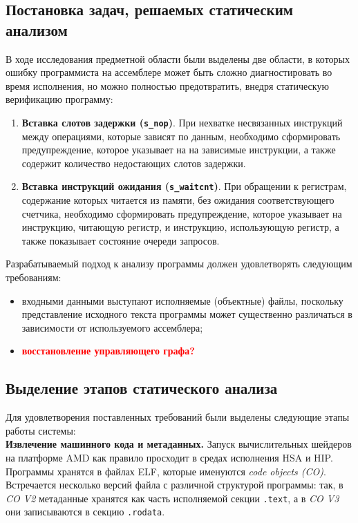 \documentclass[a4paper,14pt]{extarticle}
\newcommand{\todo}[1]{\textbf{\textcolor{red}{#1}}}
\newcommand{\topic}[1]{\textbf{#1.}}
\newenvironment{ul}{\begin{itemize}[noitemsep,topsep=0em]}{\end{itemize}\vspace{4mm}}
\newenvironment{ol}{\begin{enumerate}[noitemsep,topsep=0em]}{\end{enumerate}\vspace{4mm}}
\begin{document}
\subsection{Постановка задач, решаемых статическим анализом}

В ходе исследования предметной области были выделены две области, в которых ошибку программиста
на ассемблере может быть сложно диагностировать во время исполнения, но можно полностью
предотвратить, внедря статическую верификацию программу:
\begin{ol}
\item \textbf{Вставка слотов задержки (\texttt{s\_nop})}. При нехватке несвязанных инструкций между операциями, которые зависят по данным, необходимо сформировать предупреждение, которое указывает на
на зависимые инструкции, а также содержит количество недостающих слотов задержки.
\item \textbf{Вставка инструкций ожидания (\texttt{s\_waitcnt})}. При обращении к регистрам, содержание которых читается из памяти, без ожидания соответствующего счетчика, необходимо сформировать предупреждение, которое указывает на инструкцию, читающую регистр, и инструкцию, использующую регистр, а также показывает состояние очереди запросов.
\end{ol}

Разрабатываемый подход к анализу программы должен удовлетворять следующим требованиям:

\begin{ul}
\item входными данными выступают исполняемые (объектные) файлы, поскольку представление исходного текста программы может существенно различаться в зависимости от используемого ассемблера;
\item \todo{восстановление управляющего графа?}
\end{ul}

\subsection{Выделение этапов статического анализа}

Для удовлетворения поставленных требований были выделены следующие этапы работы системы:\\

\topic{Извлечение машинного кода и метаданных} Запуск вычислительных шейдеров на платформе AMD
как правило просходит в средах исполнения HSA и HIP. Программы хранятся в файлах ELF,
которые именуются \textit{code objects (CO)}.
Встречается несколько версий файла с различной структурой программы: так,
в \textit{CO V2} метаданные хранятся как часть исполняемой секции \texttt{.text}, а
в \textit{CO V3} они записываются в секцию \texttt{.rodata}.
\end{document}
